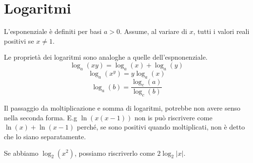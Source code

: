 \documentclass[a4paper]{article}
\begin{document}

\section{Logaritmi}

L'esponenziale è definiti per basi \(a > 0\).
Assume, al variare di \(x\), tutti i valori reali positivi se \(x \neq 1\).


Le proprietà dei logaritmi sono analoghe a quelle dell'espnonenziale.
 {
    \[
        \log_a(xy) = \log_a(x) + \log_a(y)
    \]
    \[
        \log_a(x^y) = y\log_a(x)
    \]
    \[
        \log_a(b) = \frac{\log_c(a)}{\log_c(b)}
    \]
}



Il passaggio da moltiplicazione e somma di logaritmi, potrebbe non avere senso
nella seconda forma.
E.g \(\ln(x(x-1))\) non is può riscrivere come \(\ln(x) + \ln(x-1)\)
perché, se sono positivi quando moltiplicati, non è detto che lo siano separatamente.

Se abbiamo \(\log_2(x^2)\), possiamo riscriverlo come \(2 \log_2|x|\).


\end{document}
